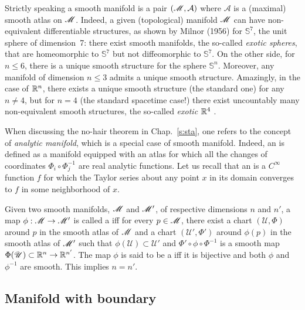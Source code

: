 \begin{remark}
Strictly speaking a smooth manifold is a pair $(\mathscr{M},\mathcal{A})$  where
$\mathcal{A}$ is a (maximal) smooth atlas on $\mathscr{M}$.
Indeed, a given (topological) manifold $\mathscr{M}$
can have non-equivalent differentiable structures, as shown by Milnor (1956) \cite{Milno56}
for $\mathbb{S}^7$, the unit sphere of dimension~7: there exist smooth manifolds, the so-called \emph{exotic spheres},
that are homeomorphic to $\mathbb{S}^7$ but not diffeomorphic
to $\mathbb{S}^7$.  On the other side, for $n\leq 6$, there is a unique smooth
structure for the sphere $\mathbb{S}^n$.
Moreover, any manifold of dimension $n\leq 3$ admits a unique smooth structure.
Amazingly, in the case of $\mathbb{R}^n$, there exists a unique smooth structure (the standard one) for any $n\not=4$, but for $n=4$ (the standard spacetime case!) there exist uncountably many non-equivalent smooth structures, the so-called
\emph{exotic $\mathbb{R}^4$} \cite{Taube87}.
\end{remark}

\begin{remark} \label{r:bas:analytic}
When discussing the no-hair theorem in Chap.~\ref{s:sta}, one
refers to the concept of
\emph{analytic manifold},
which is a special case of smooth manifold. Indeed, an
is defined as a manifold equipped with an atlas for which all the changes of coordinates
$\Phi_i \circ \Phi_j^{-1}$ are real analytic functions.
Let us recall that an 
is a $C^\infty$ function $f$ for
which the Taylor series about any point $x$ in its domain converges to $f$
in some neighborhood of $x$.
\end{remark}

Given two smooth manifolds, $\mathscr{M}$ and $\mathscr{M}'$, of
respective dimensions $n$ and $n'$, a map
$\phi : \mathscr{M} \rightarrow \mathscr{M}'$ is called a  iff
for every $p\in\mathscr{M}$, there exist a chart $(\mathscr{U},\Phi)$ around $p$ in the smooth atlas of $\mathscr{M}$
and a chart $(\mathscr{U}',\Phi')$ around $\phi(p)$ in the smooth atlas of $\mathscr{M}'$ such that
$\phi(\mathscr{U}) \subset \mathscr{U}'$ and
$\Phi'\circ \phi \circ \Phi^{-1}$ is a smooth map
$\Phi(\mathscr{U}) \subset \mathbb{R}^n \to \mathbb{R}^{n'}$.
The map $\phi$ is said to be a  iff
it is bijective and both $\phi$ and $\phi^{-1}$ are smooth. This implies $n=n'$.


\subsection{Manifold with boundary} \label{s:bas:manif_boundary}


